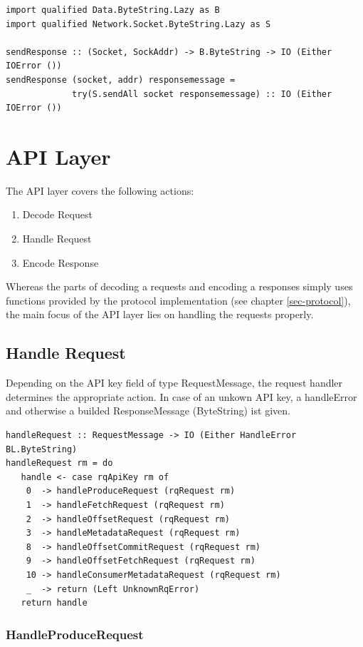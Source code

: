 \begin{lstlisting}
import qualified Data.ByteString.Lazy as B
import qualified Network.Socket.ByteString.Lazy as S

sendResponse :: (Socket, SockAddr) -> B.ByteString -> IO (Either IOError ())
sendResponse (socket, addr) responsemessage = 
             try(S.sendAll socket responsemessage) :: IO (Either IOError ())
\end{lstlisting}

\section{API Layer}
\label{sec:broker-api}
The API layer covers the following actions: 
\begin{enumerate}
    \item Decode Request
    \item Handle Request
    \item Encode Response
\end{enumerate}

Whereas the parts of decoding a requests and encoding a responses simply uses functions
provided by the protocol implementation (see chapter \ref{sec-protocol}), the
main focus of the API layer lies on handling the requests properly. 

\subsection{Handle Request}
\label{sec:impl-broker-api-handle}
Depending on the API key field of type RequestMessage, the request handler
determines the appropriate action. In case of an unkown API key, a handleError
and otherwise a builded ResponseMessage (ByteString) ist given. 

\begin{lstlisting}
handleRequest :: RequestMessage -> IO (Either HandleError BL.ByteString)
handleRequest rm = do
   handle <- case rqApiKey rm of
    0  -> handleProduceRequest (rqRequest rm)
    1  -> handleFetchRequest (rqRequest rm)
    2  -> handleOffsetRequest (rqRequest rm)
    3  -> handleMetadataRequest (rqRequest rm)
    8  -> handleOffsetCommitRequest (rqRequest rm)
    9  -> handleOffsetFetchRequest (rqRequest rm)
    10 -> handleConsumerMetadataRequest (rqRequest rm)
    _  -> return (Left UnknownRqError)
   return handle
\end{lstlisting}

\subsubsection{HandleProduceRequest}
\label{subsec:broker-api-producerequest}

